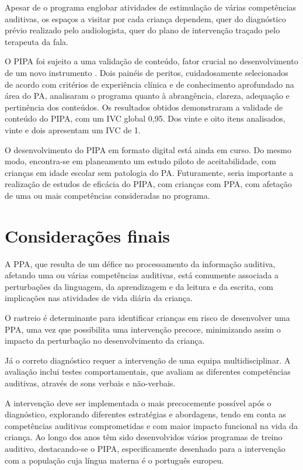 \documentclass[output=paper,colorlinks,citecolor=brown,booklanguage=portuguese]{langscibook}
\begin{document}
Apesar de o programa englobar atividades de estimulação de várias competências auditivas, os espaços a visitar por cada criança dependem, quer do diagnóstico prévio realizado pelo audiologista, quer do plano de intervenção traçado pelo terapeuta da fala.

O PIPA foi sujeito a uma validação de conteúdo, fator crucial no desenvolvimento de um novo instrumento \citep{Alexandre2011, Coutinho2014a, Grant1997}. Dois painéis de peritos, cuidadosamente selecionados de acordo com critérios de experiência clínica e de conhecimento aprofundado na área do PA, analisaram o programa quanto à abrangência, clareza, adequação e pertinência dos conteúdos. Os resultados obtidos demonstraram a validade de conteúdo do PIPA, com um IVC global 0,95. Dos vinte e oito itens analisados, vinte e dois apresentam um IVC de 1. 

O desenvolvimento do PIPA em formato digital está ainda em curso. Do mesmo modo, encontra-se em planeamento um estudo piloto de aceitabilidade, com crianças em idade escolar sem patologia do PA. Futuramente, seria importante a realização de estudos de eficácia do PIPA, com crianças com PPA, com afetação de uma ou mais competências consideradas no programa.

\section{Considerações finais}
A PPA, que resulta de um défice no processamento da informação auditiva, afetando uma ou várias competências auditivas, está comumente associada a perturbações da linguagem, da aprendizagem e da leitura e da escrita, com implicações nas atividades de vida diária da criança. 

O rastreio é determinante para identificar crianças em risco de desenvolver uma PPA, uma vez que possibilita uma intervenção precoce, minimizando assim o impacto da perturbação no desenvolvimento da criança.

Já o correto diagnóstico requer a intervenção de uma equipa multidisciplinar. A avaliação inclui testes comportamentais, que avaliam as diferentes competências auditivas, através de sons verbais e não-verbais.

A intervenção deve ser implementada o mais precocemente possível após o diagnóstico, explorando diferentes estratégias e abordagens, tendo em conta as competências auditivas comprometidas e com maior impacto funcional na vida da criança. Ao longo dos anos têm sido desenvolvidos vários programas de treino auditivo, destacando-se o PIPA, especificamente desenhado para a intervenção com a população cuja língua materna é o português europeu.


{\sloppy\printbibliography[heading=subbibliography,notkeyword=this]}
\end{document}
